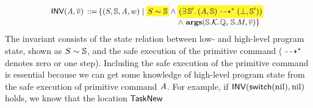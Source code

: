 \[
    \small
    \begin{array}{l}
        \!\!
        \INV{(\primcom, \args{\val})} \, \define \,
        \{
            (\state, \hpstate, \primcom, \word) \sepline
            \colorbox{yellow!80}{\!$\stateRel{\state}{\hpstate}$\!}
            \land
            \colorbox{yellow!80}
            {\!\!\!
                $(\exists \, \hpstate'. \,
                \primMultiTrans
                    {(\primcom, \hpstate)}
                    {*}{(\primdone, \hpstate')})$
            \!\!\!} \\
            \hspace*{15.8em}
            \land \
            \arguments(\hpstate.\hthrdlocalst.\hRstate, \,
            \hpstate.\Mem, \args{\val})
        \}
    \end{array}
\]
The invariant consists of the state relation between low- and
high-level program state,
shown as ${S} \sim {\mathbb{S}}$,
and the safe execution of the primitive command
(${} \dashrightarrow^{*} {}$ denotes zero or one step).
Including the safe execution of
the primitive command is essential
because we can get some knowledge of high-level program
state from the safe execution of
primitive command $\textit{A}$.
For example, if $\textsf{INV}{(\mathsf{switch}(\text{nil}), \text{nil})}$
holds, we know that the location $\mathsf{TaskNew}$
